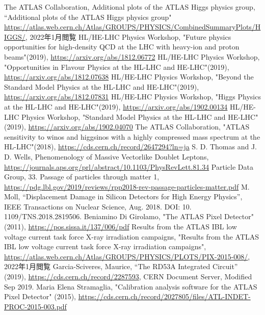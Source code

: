 \begin{thebibliography}{24}
The ATLAS Collaboration, Additional plots of the ATLAS Higgs physics group, “Additional plots of the ATLAS Higgs physics group" \url{https://atlas.web.cern.ch/Atlas/GROUPS/PHYSICS/CombinedSummaryPlots/HIGGS/}, 2022年1月閲覧
HL/HE-LHC Physics Workshop, "Future physics opportunities for high-density QCD at the LHC with heavy-ion and proton beams"(2019), \url{https://arxiv.org/abs/1812.06772}
HL/HE-LHC Physics Workshop, "Opportunities in Flavour Physics at the HL-LHC and HE-LHC"(2019), \url{https://arxiv.org/abs/1812.07638}
HL/HE-LHC Physics Workshop, "Beyond the Standard Model Physics at the HL-LHC and HE-LHC"(2019), \url{https://arxiv.org/abs/1812.07831}
HL/HE-LHC Physics Workshop, "Higgs Physics at the HL-LHC and HE-LHC"(2019), \url{https://arxiv.org/abs/1902.00134}
HL/HE-LHC Physics Workshop, "Standard Model Physics at the HL-LHC and HE-LHC"(2019), \url{https://arxiv.org/abs/1902.04070}
The ATLAS Collaboration, "ATLAS sensitivity to winos and higgsinos with a highly compressed mass spectrum at the HL-LHC"(2018), \url{https://cds.cern.ch/record/2647294?ln=ja}
S. D. Thomas and J. D. Wells, Phenomenology of Massive Vectorlike Doublet Leptons, \url{https://journals.aps.org/prl/abstract/10.1103/PhysRevLett.81.34}
Particle Data Group, 33. Passage of particles through matter 1,
\url{https://pdg.lbl.gov/2019/reviews/rpp2018-rev-passage-particles-matter.pdf}
M. Moll, “Displacement Damage in Silicon Detectors for High Energy Physics”, IEEE Transactions on Nuclear Science, Aug. 2018. DOI: 10. 1109/TNS.2018.2819506.
Beniamino Di Girolamo, "The ATLAS Pixel Detector" (2011), \url{https://pos.sissa.it/137/006/pdf}
Results from the ATLAS IBL low voltage current task force X-ray irradiation campaigns, "Results from the ATLAS IBL low voltage current task force X-ray irradiation campaigns", \url{https://atlas.web.cern.ch/Atlas/GROUPS/PHYSICS/PLOTS/PIX-2015-008/}, 2022年1月閲覧
Garcia-Sciveres, Maurice, “The RD53A Integrated Circuit” (2019), \url{https://cds.cern.ch/record/2287593}, CERN Document Server, Modified Sep 2019.
Maria Elena Stramaglia, "Calibration analysis software for the ATLAS Pixel Detector" (2015), \url{https://cds.cern.ch/record/2027805/files/ATL-INDET-PROC-2015-003.pdf}

\end{thebibliography}
